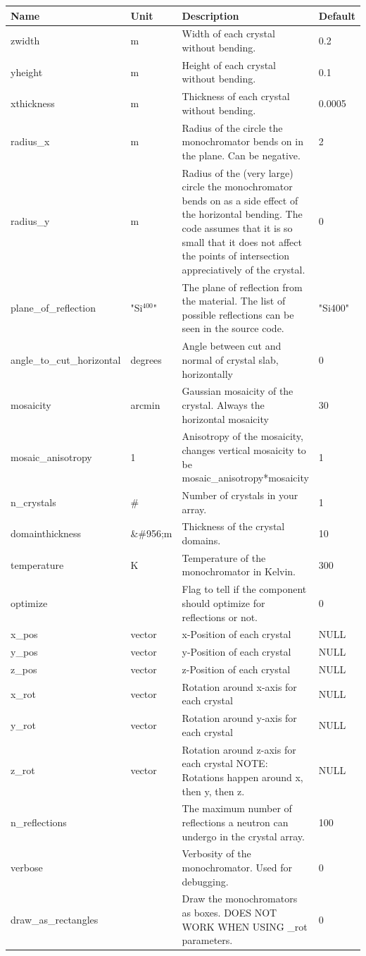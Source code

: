 \begin{longtable}{p{}p{}p{}p{}}
\toprule
\textbf{Name} & \textbf{Unit} & \textbf{Description} & \textbf{Default} \\
\midrule
\endhead
zwidth & m & Width of each crystal without bending. & 0.2 \\
yheight & m & Height of each crystal without bending. & 0.1 \\
xthickness & m & Thickness of each crystal without bending. & 0.0005 \\
radius\_x & m & Radius of the circle the monochromator bends on in the plane. Can be negative. & 2 \\
radius\_y & m & Radius of the (very large) circle the monochromator bends on as a side effect of the horizontal bending. The code assumes that it is so small that it does not affect the points of intersection appreciatively of the crystal. & 0 \\
plane\_of\_reflection & "Si$^{400}$" & The plane of reflection from the material. The list of possible reflections can be seen in the source code. & "Si400" \\
angle\_to\_cut\_horizontal & degrees & Angle between cut and normal of crystal slab, horizontally & 0 \\
mosaicity & arcmin & Gaussian mosaicity of the crystal. Always the horizontal mosaicity & 30 \\
mosaic\_anisotropy & 1 & Anisotropy of the mosaicity, changes vertical mosaicity to be mosaic\_anisotropy*mosaicity & 1 \\
n\_crystals & \# & Number of crystals in your array. & 1 \\
domainthickness & \&\#956;m & Thickness of the crystal domains. & 10 \\
temperature & K & Temperature of the monochromator in Kelvin. & 300 \\
optimize &   & Flag to tell if the component should optimize for reflections or not. & 0 \\
x\_pos & vector & x-Position of each crystal & NULL \\
y\_pos & vector & y-Position of each crystal & NULL \\
z\_pos & vector & z-Position of each crystal & NULL \\
x\_rot & vector & Rotation around x-axis for each crystal & NULL \\
y\_rot & vector & Rotation around y-axis for each crystal & NULL \\
z\_rot & vector & Rotation around z-axis for each crystal NOTE: Rotations happen around x, then y, then z. & NULL \\
n\_reflections &   & The maximum number of reflections a neutron can undergo in the crystal array. & 100 \\
verbose &   & Verbosity of the monochromator. Used for debugging. & 0 \\
draw\_as\_rectangles &   & Draw the monochromators as boxes. DOES NOT WORK WHEN USING \_rot parameters. & 0 \\
\bottomrule
\end{longtable}

